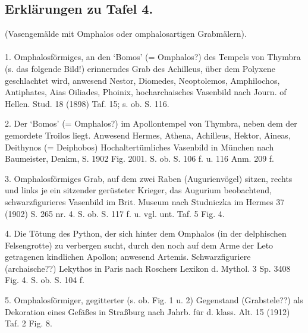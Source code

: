 \documentclass[a4paper, 11pt, oneside]{article}
\begin{document}
\subsection{Erklärungen zu Tafel 4.}
\begin{center}
(Vasengemälde mit Omphalos oder omphalosartigen Grabmälern).
\end{center}
\paragraph{}
1. Omphalosförmiges, an den `Bomos' (= Omphalos?) des Tempels von Thymbra (s. das folgende Bild!) erinnerndes Grab des Achilleus, über dem Polyxene geschlachtet wird, anwesend Nestor, Diomedes, Neoptolemos, Amphilochos, Antiphates, Aias Oiliades, Phoinix, hocharchaisches Vasenbild nach Journ. of Hellen. Stud. 18 (1898) Taf. 15; s. ob. S. 116.

2. Der `Bomos' (= Omphalos?) im Apollontempel von Thymbra, neben dem der gemordete Troilos liegt. Anwesend Hermes, Athena, Achilleus, Hektor, Aineas, Deithynos (= Deiphobos) Hochaltertümliches Vasenbild in München nach Baumeister, Denkm, S. 1902 Fig. 2001. S. ob. S. 106 f. u. 116 Anm. 209 f.

3. Omphalosförmiges Grab, auf dem zwei Raben (Augurienvögel) sitzen, rechts und links je ein sitzender gerüsteter Krieger, das Augurium beobachtend, schwarzfigurieres Vasenbild im Brit. Museum nach Studniczka im Hermes 37 (1902) S. 265 nr. 4. S. ob. S. 117 f. u. vgl. unt. Taf. 5 Fig. 4.

4. Die Tötung des Python, der sich hinter dem Omphalos (in der delphischen Felsengrotte) zu verbergen sucht, durch den noch auf dem Arme der Leto getragenen kindlichen Apollon; anwesend Artemis. Schwarzfiguriere (archaische??) Lekythos in Paris nach Roschers Lexikon d. Mythol. 3 Sp. 3408 Fig. 4. S. ob. S. 104 f.

5. Omphalosförmiger, gegitterter (s. ob. Fig. 1 u. 2) Gegenstand (Grabstele??) als Dekoration eines Gefäßes in Straßburg nach Jahrb. für d. klass. Alt. 15 (1912) Taf. 2 Fig. 8.
\end{document}
